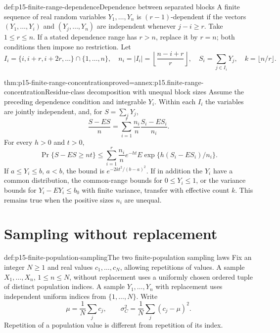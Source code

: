 \begin{hbdefinition}{def:p15-finite-range-dependence}{Dependence between separated blocks}
A finite sequence of real random variables \(Y_1,\ldots,Y_n\)
is \((r-1)\)-dependent if
the vectors \((Y_1,\ldots,Y_i)\) and \((Y_j,\ldots,Y_n)\) are independent
whenever \(j-i\geq r\). Take \(1\leq r\leq n\).
If a stated dependence range has \(r>n\), replace it by \(r=n\);
both conditions then impose no restriction.
Let
\[
 I_i=\{i,i+r,i+2r,\ldots\}\cap\{1,\ldots,n\},\quad
 n_i=|I_i|=\left\lfloor\frac{n-i+r}{r}\right\rfloor,\quad
 S_i=\sum_{j\in I_i}Y_j,\quad k=\lfloor n/r\rfloor .
\]
\end{hbdefinition}

\begin{hbtheorem}{thm:p15-finite-range-concentration}{proved=annex:p15.finite-range-concentration}{Residue-class decomposition with unequal block sizes}
Assume the preceding dependence condition and integrable \(Y_i\).
Within each \(I_i\) the variables are jointly independent, and, for
\(S=\sum_jY_j\),
\[
 \frac{S-ES}{n}
 =\sum_{i=1}^r\frac{n_i}{n}\frac{S_i-ES_i}{n_i}.
\]
For every \(h>0\) and \(t>0\),
\[
 \Pr\{S-ES\geq nt\}
 \leq\sum_{i=1}^r\frac{n_i}{n}e^{-ht}
       E\exp\{h(S_i-ES_i)/n_i\}.
\]
If \(a\leq Y_i\leq b\), \(a<b\), the bound is
\(e^{-2kt^2/(b-a)^2}\). If in addition the \(Y_i\) have a common
distribution, the common-range bounds for \(0\leq Y_i\leq1\), or
the variance bounds for \(Y_i-EY_i\leq b_0\) with finite variance,
transfer with effective count \(k\).
This remains true when the positive sizes \(n_i\) are unequal.
\end{hbtheorem}

\section{Sampling without replacement}
\label{sec:p15-finite-population-concentration}

\begin{hbdefinition}{def:p15-finite-population-sampling}{The two finite-population sampling laws}
Fix an integer \(N\geq1\) and real values \(c_1,\ldots,c_N\), allowing
repetitions of values.
A sample \(X_1,\ldots,X_n\), \(1\leq n\leq N\), without replacement
uses a uniformly chosen ordered tuple of distinct population indices.
A sample \(Y_1,\ldots,Y_n\) with replacement uses independent uniform
indices from \(\{1,\ldots,N\}\). Write
\[
 \mu=\frac1N\sum_jc_j,\qquad
 \sigma_C^2=\frac1N\sum_j(c_j-\mu)^2.
\]
Repetition of a population value is different from repetition of its index.
\end{hbdefinition}

